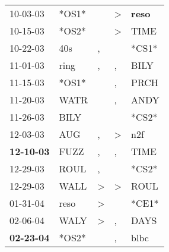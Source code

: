 \begin{supertabular}{p{0.07\textwidth}p{0.06\textwidth}p{0.02\textwidth}p{0.02\textwidth}p{0.06\textwidth}}
          10-03-03\textsuperscript{} &                            *OS1* &                  &     \textgreater &  \textbf{reso\textsuperscript{}} \\
          10-15-03\textsuperscript{} &                            *OS2* &                  &     \textgreater &           TIME\textsuperscript{} \\
          10-22-03\textsuperscript{} &            40s\textsuperscript{} &                , &                  &                            *CS1* \\
          11-01-03\textsuperscript{} &           ring\textsuperscript{} &                , &                , &           BILY\textsuperscript{} \\
          11-15-03\textsuperscript{} &                            *OS1* &                  &                , &           PRCH\textsuperscript{} \\
          11-20-03\textsuperscript{} &           WATR\textsuperscript{} &                  &                , &           ANDY\textsuperscript{} \\
          11-26-03\textsuperscript{} &           BILY\textsuperscript{} &                  &                  &                            *CS2* \\
          12-03-03\textsuperscript{} &            AUG\textsuperscript{} &                , &     \textgreater &            n2f\textsuperscript{} \\
 \textbf{12-10-03\textsuperscript{}} &           FUZZ\textsuperscript{} &                , &                , &           TIME\textsuperscript{} \\
          12-29-03\textsuperscript{} &           ROUL\textsuperscript{} &                , &                  &                            *CS2* \\
          12-29-03\textsuperscript{} &           WALL\textsuperscript{} &     \textgreater &     \textgreater &           ROUL\textsuperscript{} \\
          01-31-04\textsuperscript{} &           reso\textsuperscript{} &     \textgreater &                  &                            *CE1* \\
          02-06-04\textsuperscript{} &           WALY\textsuperscript{} &     \textgreater &                , &           DAYS\textsuperscript{} \\
 \textbf{02-23-04\textsuperscript{}} &                            *OS2* &                  &                , &           blbc\textsuperscript{} \\

\end{supertabular}
